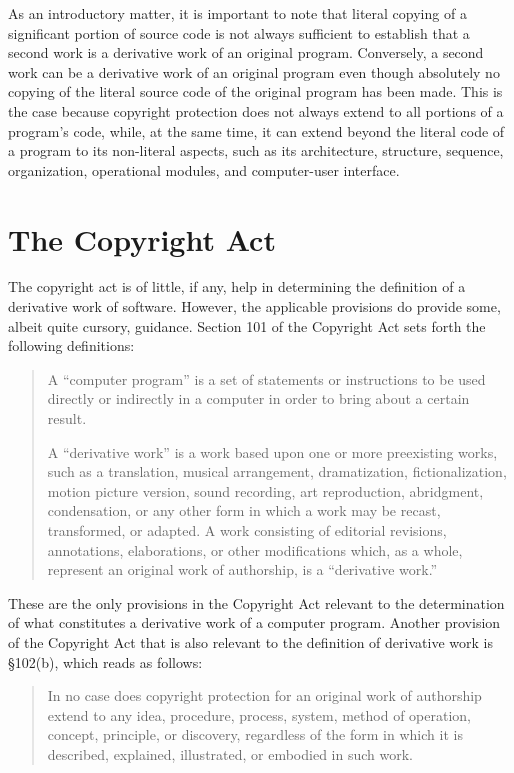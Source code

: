 \documentclass[11pt, letterpaper]{book}
\begin{document}
As an introductory matter, it is important to note that literal copying of
a significant portion of source code is not always sufficient to establish
that a second work is a derivative work of an original
program. Conversely, a second work can be a derivative work of an original
program even though absolutely no copying of the literal source code of
the original program has been made. This is the case because copyright
protection does not always extend to all portions of a program's code,
while, at the same time, it can extend beyond the literal code of a
program to its non-literal aspects, such as its architecture, structure,
sequence, organization, operational modules, and computer-user interface.

\section{The Copyright Act}

The copyright act is of little, if any, help in determining the definition
of a derivative work of software. However, the applicable provisions do
provide some, albeit quite cursory, guidance. Section 101 of the Copyright
Act sets forth the following definitions:

\begin{quotation}
A ``computer program'' is a set of statements or instructions to be used
directly or indirectly in a computer in order to bring about a certain
result.

A ``derivative work'' is a work based upon one or more preexisting works,
such as a translation, musical arrangement, dramatization,
fictionalization, motion picture version, sound recording, art
reproduction, abridgment, condensation, or any other form in which a work
may be recast, transformed, or adapted. A work consisting of editorial
revisions, annotations, elaborations, or other modifications which, as a
whole, represent an original work of authorship, is a ``derivative work.''
\end{quotation}

These are the only provisions in the Copyright Act relevant to the
determination of what constitutes a derivative work of a computer
program. Another provision of the Copyright Act that is also relevant to
the definition of derivative work is \S 102(b), which reads as follows:

\begin{quotation}
In no case does copyright protection for an original work of authorship
extend to any idea, procedure, process, system, method of operation,
concept, principle, or discovery, regardless of the form in which it is
described, explained, illustrated, or embodied in such work.
\end{quotation}
\end{document}
